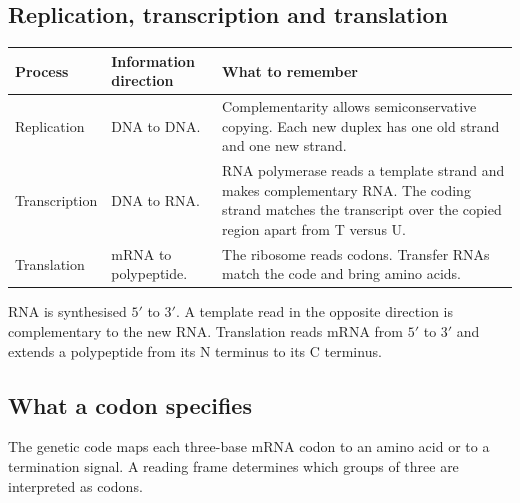 \documentclass[12pt,a4paper]{article}
\begin{document}
\subsection{Replication, transcription and translation}
\par\vspace{5pt}
\begingroup
\setlength{\extrarowheight}{1pt}
\noindent\begin{tabularx}{\linewidth}{|B{3.2cm}|Y|Y|}
\hline
\textbf{Process} & \textbf{Information direction} & \textbf{What to remember} \\ \hline
Replication & DNA to DNA. & Complementarity allows semiconservative copying. Each new duplex has one old strand and one new strand. \\ \hline
Transcription & DNA to RNA. & RNA polymerase reads a template strand and makes complementary RNA. The coding strand matches the transcript over the copied region apart from T versus U. \\ \hline
Translation & mRNA to polypeptide. & The ribosome reads codons. Transfer RNAs match the code and bring amino acids. \\ \hline
\end{tabularx}\par
\endgroup
\begin{tcolorbox}[masonbox, title={Follow direction carefully}]
RNA is synthesised $5'$ to $3'$. A template read in the opposite direction is complementary to the new RNA. Translation reads mRNA from $5'$ to $3'$ and extends a polypeptide from its N terminus to its C terminus.
\end{tcolorbox}

\subsection{What a codon specifies}
\begin{tcolorbox}[defbox, title={Genetic code}]
The genetic code maps each three-base mRNA codon to an amino acid or to a termination signal. A reading frame determines which groups of three are interpreted as codons.
\end{tcolorbox}
\end{document}
